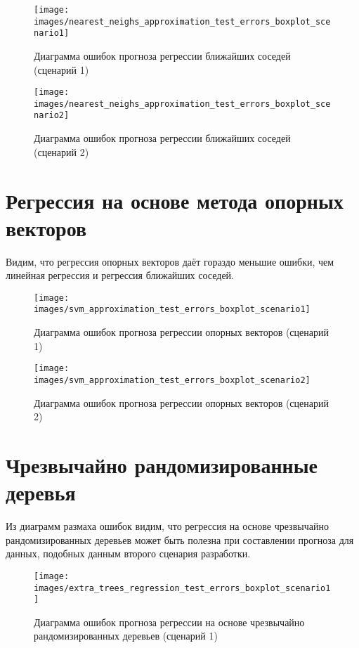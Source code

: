 \begin{figure}[H] 
	\center
	\texttt{[image: images/nearest\_neighs\_approximation\_test\_errors\_boxplot\_scenario1]}
	\caption{Диаграмма ошибок прогноза регрессии ближайших соседей (сценарий 1)} 
	\label{fig:neighs-reg-1}
\end{figure}

\begin{figure}[H] 
	\center
	\texttt{[image: images/nearest\_neighs\_approximation\_test\_errors\_boxplot\_scenario2]}
	\caption{Диаграмма ошибок прогноза регрессии ближайших соседей (сценарий 2)} 
	\label{fig:neighs-reg-2}
\end{figure}


\section{Регрессия на основе метода опорных векторов} \label{ch1:sec3}

Видим, что регрессия опорных векторов даёт гораздо меньшие ошибки, чем линейная регрессия и регрессия ближайших соседей.

\begin{figure}[H] 
	\center
	\texttt{[image: images/svm\_approximation\_test\_errors\_boxplot\_scenario1]}
	\caption{Диаграмма ошибок прогноза регрессии опорных векторов (сценарий 1)} 
	\label{fig:svm-reg-1}
\end{figure}

\begin{figure}[H] 
	\center
	\texttt{[image: images/svm\_approximation\_test\_errors\_boxplot\_scenario2]}
	\caption{Диаграмма ошибок прогноза регрессии опорных векторов (сценарий 2)} 
	\label{fig:svm-reg-2}
\end{figure}

\section{Чрезвычайно рандомизированные деревья} \label{ch1:sec4}

Из диаграмм размаха ошибок видим, что регрессия на основе чрезвычайно рандомизированных деревьев может быть полезна при составлении прогноза для данных, подобных данным второго сценария разработки.

\begin{figure}[H] 
	\center
	\texttt{[image: images/extra\_trees\_regression\_test\_errors\_boxplot\_scenario1]}
	\caption{Диаграмма ошибок прогноза регрессии на основе чрезвычайно рандомизированных деревьев (сценарий 1)} 
	\label{fig:extra-trees-reg-1}
\end{figure}

